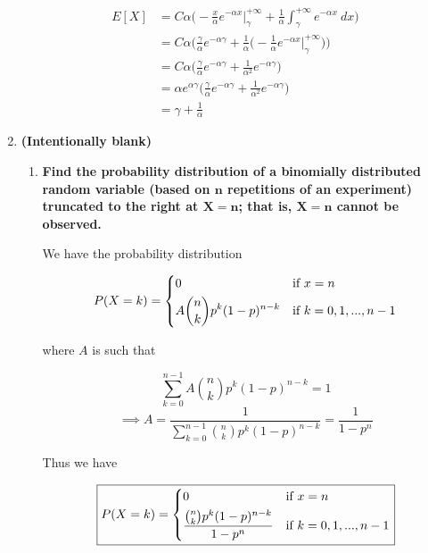 \documentclass[10pt, oneside]{article}   	%
\theoremstyle{definition}
\begin{document}
\begin{enumerate}[label=9.\arabic*]
\begin{align*}
E[X] &= C\alpha \bigg( -\frac{x}{\alpha} e^{-\alpha x} \bigg|^{+\infty}_\gamma + \frac{1}{\alpha} \int^{+\infty}_\gamma e^{-\alpha x} \ dx \bigg) \\
&= C\alpha \bigg( \frac{\gamma}{\alpha} e^{-\alpha \gamma} + \frac{1}{\alpha} \bigg( -\frac{1}{\alpha} e^{-\alpha x} \bigg|^{+\infty}_\gamma \bigg) \bigg) \\
&= C\alpha \bigg( \frac{\gamma}{\alpha} e^{-\alpha \gamma} + \frac{1}{\alpha^2} e^{-\alpha \gamma} \bigg) \\
&= \alpha e^{\alpha \gamma} \bigg( \frac{\gamma}{\alpha} e^{-\alpha \gamma} + \frac{1}{\alpha^2} e^{-\alpha \gamma} \bigg) \\
&= \boxed{\gamma + \frac{1}{\alpha}}
\end{align*}

\item  \begin{tcolorbox}[
  colback=Cerulean!5!white,
  colframe=Cerulean!75!black]
\textbf{(Intentionally blank)}
\end{tcolorbox}

	\begin{enumerate}
	\item  \begin{tcolorbox}[
	  colback=Cerulean!5!white,
	  colframe=Cerulean!75!black]
	\textbf{Find the probability distribution of a binomially distributed random variable (based on $\bm{n}$ repetitions of an experiment) truncated to the right at $\bm{X = n}$; that is, $\bm{X = n}$ cannot be observed.}
	\end{tcolorbox}
	
	We have the probability distribution
	
	\[
	P(X = k) = \begin{dcases}
	0 & \text{if } x = n \\
	A \binom{n}{k} p^k (1-p)^{n-k} & \text{if } k = 0, 1, ..., n-1
	\end{dcases}
	\]
	
	where $A$ is such that
	
	\[ \sum^{n-1}_{k=0} A \binom{n}{k} p^k (1-p)^{n-k} = 1 \]
	\[ \implies A = \frac{1}{\sum^{n-1}_{k=0} \binom{n}{k} p^k (1-p)^{n-k}} = \frac{1}{1-p^n} \]
	
	Thus we have
	
		\[ \boxed{
	P(X = k) = \begin{dcases}
	0 & \text{if } x = n \\
	\frac{\binom{n}{k} p^k (1-p)^{n-k}}{1-p^n} & \text{if } k = 0, 1, ..., n-1
	\end{dcases} }
	\]
	

\end{enumerate}
\end{enumerate}
\end{document}
